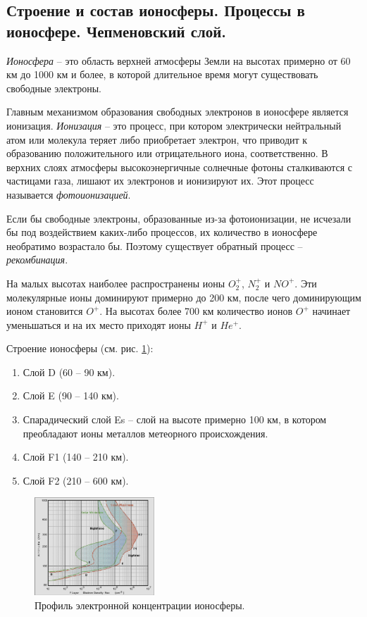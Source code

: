 \subsection{Строение и состав ионосферы. Процессы в ионосфере. Чепменовский слой.}
\textit{Ионосфера} -- это область верхней атмосферы Земли на высотах примерно от 60 км до 1000 км и более, в которой длительное время могут существовать свободные электроны.

Главным механизмом образования свободных электронов в ионосфере является ионизация.
\textit{Ионизация} – это процесс, при котором электрически нейтральный атом или молекула теряет либо приобретает электрон, что приводит к образованию положительного или отрицательного иона, соответственно.
В верхних слоях атмосферы высокоэнергичные солнечные фотоны сталкиваются с частицами газа, лишают их электронов и ионизируют их.
Этот процесс называется \textit{фотоионизацией}.

Если бы свободные электроны, образованные из-за фотоионизации, не исчезали бы под воздействием каких-либо процессов, их количество в ионосфере необратимо возрастало бы.
Поэтому существует обратный процесс -- \textit{рекомбинация}.

На малых высотах наиболее распространены ионы $O^+_2$, $N^+_2$ и $NO^+$.
Эти молекулярные ионы доминируют примерно до 200 км, после чего доминирующим ионом становится $O^+$.
На высотах более 700 км количество ионов $O^+$ начинает уменьшаться и на их место приходят ионы $H^+$ и $He^+$.

Строение ионосферы (см. рис. \ref{fig:ne(h)}):
\begin{enumerate}
\item Слой D (60 -- 90 км).
\item Слой E (90 -- 140 км).
\item Спарадический слой Es -- слой на высоте примерно 100 км, в котором преобладают ионы металлов метеорного происхождения.
\item Слой F1 (140 -- 210 км).
\item Слой F2 (210 -- 600 км).
\end{enumerate}

\begin{figure}[!ht]
\centering
\includegraphics[width=0.4\textwidth]{images/ne(h).png}
\caption{Профиль электронной концентрации ионосферы.}\label{fig:ne(h)}
\end{figure}

